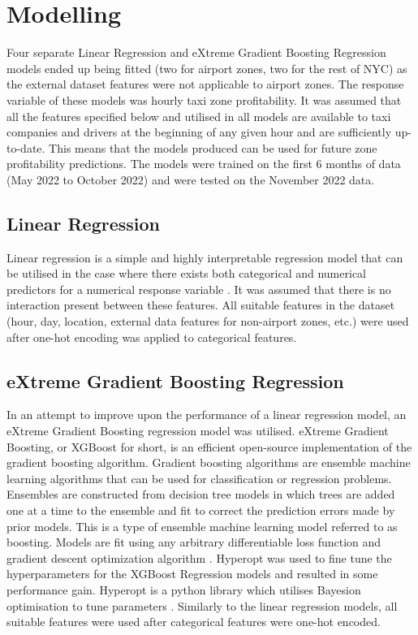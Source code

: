 \documentclass[11pt]{article}
\begin{document}
\section{Modelling}
Four separate Linear Regression and eXtreme Gradient Boosting Regression models ended up being fitted (two for airport zones, two for the rest of NYC) as the external dataset features were not applicable to airport zones. The response variable of these models was hourly taxi zone profitability. It was assumed that all the features specified below and utilised in all models are available to taxi companies and drivers at the beginning of any given hour and are sufficiently up-to-date. This means that the models produced can be used for future zone profitability predictions. The models were trained on the first 6 months of data (May 2022 to October 2022) and were tested on the November 2022 data.

\subsection{Linear Regression}
Linear regression is a simple and highly interpretable regression model that can be utilised in the case where there exists both categorical and numerical predictors for a numerical response variable \cite{LsmLtfrm}. It was assumed that there is no interaction present between these features. All suitable features in the dataset (hour, day, location, external data features for non-airport zones, etc.) were used after one-hot encoding was applied to categorical features.  



\subsection{eXtreme Gradient Boosting Regression}
In an attempt to improve upon the performance of a linear regression model, an eXtreme Gradient Boosting regression model was utilised. eXtreme Gradient Boosting, or XGBoost for short, is an efficient open-source implementation of the gradient boosting algorithm. Gradient boosting algorithms are ensemble machine learning algorithms that can be used for classification or regression problems. Ensembles are constructed from decision tree models in which trees are added one at a time to the ensemble and fit to correct the prediction errors made by prior models. This is a type of ensemble machine learning model referred to as boosting. Models are fit using any arbitrary differentiable loss function and gradient descent optimization algorithm \cite{XGB}. Hyperopt was used to fine tune the hyperparameters for the XGBoost Regression models and resulted in some performance gain. Hyperopt is a python library which utilises Bayesion optimisation to tune parameters \cite{hyperopt}. Similarly to the linear regression models, all suitable features were used after categorical features were one-hot encoded. 
\end{document}
